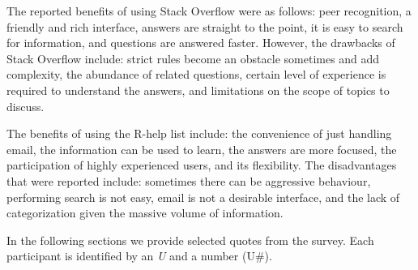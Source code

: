     The reported benefits of using Stack Overflow were as follows: peer recognition, a friendly and rich interface, answers are straight to the point, it is easy to search for information, and questions are answered faster.
    However, the drawbacks of Stack Overflow include: strict rules become an obstacle sometimes and add complexity, the abundance of related questions, certain level of experience is required to understand the answers, and limitations on the scope of topics to discuss.

    The benefits of using the R-help list include: the convenience of just handling email, the information can be used to learn, the answers are more focused, the participation of highly experienced users, and its flexibility.
    The disadvantages that were reported include: sometimes there can be aggressive behaviour, performing search is not easy, email is not a desirable interface, and the lack of categorization given the massive volume of information.

In the following sections we provide selected quotes from the survey.
Each participant is identified by an \emph{U} and a number (U\#).

